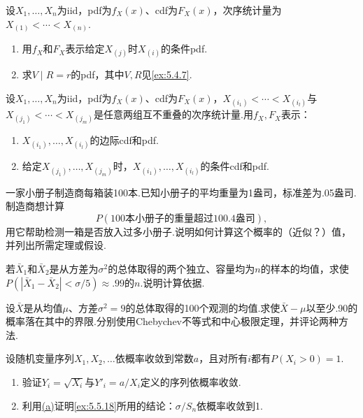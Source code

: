 \begin{exercise}\label{exercise:5.27}
设$X_1,\ldots,X_n$为iid，pdf为$f_X(x)$、cdf为$F_X(x)$，次序统计量为$X_{(1)}<\cdots<X_{(n)}$.
\begin{enumerate}[label=(\alph*)]
\item 用$f_X$和$F_X$表示给定$X_{(j)}$时$X_{(i)}$的条件pdf.
\item 求$V\mid R=r$的pdf，其中$V,R$见\autoref{ex:5.4.7}.
\end{enumerate}
\end{exercise}
\begin{exercise}\label{exercise:5.28}
设$X_1,\ldots,X_n$为iid，pdf为$f_X(x)$、cdf为$F_X(x)$，$X_{(i_1)}<\cdots<X_{(i_l)}$与$X_{(j_1)}<\cdots<X_{(j_m)}$是任意两组互不重叠的次序统计量.用$f_X,F_X$表示：
\begin{enumerate}[label=(\alph*)]
\item $X_{(i_1)},\ldots,X_{(i_l)}$的边际cdf和pdf.
\item 给定$X_{(j_1)},\ldots,X_{(j_m)}$时，$X_{(i_1)},\ldots,X_{(i_l)}$的条件cdf和pdf.
\end{enumerate}
\end{exercise}
\begin{exercise}\label{exercise:5.29}
一家小册子制造商每箱装100本.已知小册子的平均重量为1盎司，标准差为.05盎司.制造商想计算
$$P(\text{100本小册子的重量超过100.4盎司}),$$
用它帮助检测一箱是否放入过多小册子.说明如何计算这个概率的（近似？）值，并列出所需定理或假设.
\end{exercise}
\begin{exercise}\label{exercise:5.30}
若$\bar X_1$和$\bar X_2$是从方差为$\sigma^2$的总体取得的两个独立、容量均为$n$的样本的均值，求使$P(|\bar X_1-\bar X_2|<\sigma/5)\approx.99$的$n$.说明计算依据.
\end{exercise}
\begin{exercise}\label{exercise:5.31}
设$\bar X$是从均值$\mu$、方差$\sigma^2=9$的总体取得的100个观测的均值.求使$\bar X-\mu$以至少.90的概率落在其中的界限.分别使用Chebychev不等式和中心极限定理，并评论两种方法.
\end{exercise}
\begin{exercise}\label{exercise:5.32}
设随机变量序列$X_1,X_2,\ldots$依概率收敛到常数$a$，且对所有$i$都有$P(X_i>0)=1$.
\begin{enumerate}[label=(\alph*)]\item{}\label{itm:exercise:5.32:a} 验证$Y_i=\sqrt{X_i}$与$Y'_i=a/X_i$定义的序列依概率收敛.\item 利用\hyperref[itm:exercise:5.32:a]{(a)}证明\autoref{ex:5.5.18}所用的结论：$\sigma/S_n$依概率收敛到1.\end{enumerate}
\end{exercise}
